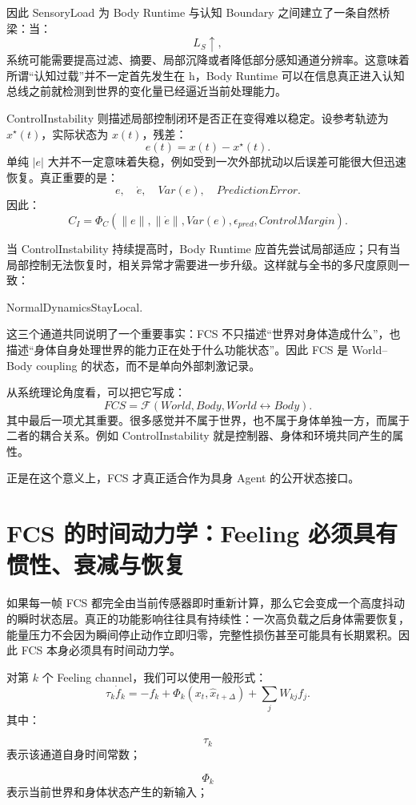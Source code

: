 因此 SensoryLoad 为 Body Runtime 与认知 Boundary 之间建立了一条自然桥梁：当：
\[
L_S\uparrow,
\]
系统可能需要提高过滤、摘要、局部沉降或者降低部分感知通道分辨率。这意味着所谓“认知过载”并不一定首先发生在 h，Body Runtime 可以在信息真正进入认知总线之前就检测到世界的变化量已经逼近当前处理能力。

ControlInstability 则描述局部控制闭环是否正在变得难以稳定。设参考轨迹为 $x^\star(t)$，实际状态为 $x(t)$，残差：
\[
e(t)=x(t)-x^\star(t).
\]
单纯 $|e|$ 大并不一定意味着失稳，例如受到一次外部扰动以后误差可能很大但迅速恢复。真正重要的是：
\[
e,\quad
\dot e,\quad
Var(e),\quad
PredictionError.
\]
因此：
\[
C_I
=
\Phi_C
(
\|e\|,
\|\dot e\|,
Var(e),
\epsilon_{pred},
ControlMargin
).
\]

当 ControlInstability 持续提高时，Body Runtime 应首先尝试局部适应；只有当局部控制无法恢复时，相关异常才需要进一步升级。这样就与全书的多尺度原则一致：
\begin{statementbox}
NormalDynamicsStayLocal.
\end{statementbox}

这三个通道共同说明了一个重要事实：FCS 不只描述“世界对身体造成什么”，也描述“身体自身处理世界的能力正在处于什么功能状态”。因此 FCS 是 World--Body coupling 的状态，而不是单向外部刺激记录。

从系统理论角度看，可以把它写成：
\[
FCS
=
\mathcal F
(
World,
Body,
World\leftrightarrow Body
).
\]
其中最后一项尤其重要。很多感觉并不属于世界，也不属于身体单独一方，而属于二者的耦合关系。例如 ControlInstability 就是控制器、身体和环境共同产生的属性。

正是在这个意义上，FCS 才真正适合作为具身 Agent 的公开状态接口。

\section{FCS 的时间动力学：Feeling 必须具有惯性、衰减与恢复}

如果每一帧 FCS 都完全由当前传感器即时重新计算，那么它会变成一个高度抖动的瞬时状态层。真正的功能影响往往具有持续性：一次高负载之后身体需要恢复，能量压力不会因为瞬间停止动作立即归零，完整性损伤甚至可能具有长期累积。因此 FCS 本身必须具有时间动力学。

对第 $k$ 个 Feeling channel，我们可以使用一般形式：
\[
\tau_k
\dot f_k
=
-f_k
+
\Phi_k(x_t,\hat x_{t+\Delta})
+
\sum_j
W_{kj}f_j.
\]
其中：

\[
\tau_k
\]
表示该通道自身时间常数；

\[
\Phi_k
\]
表示当前世界和身体状态产生的新输入；

